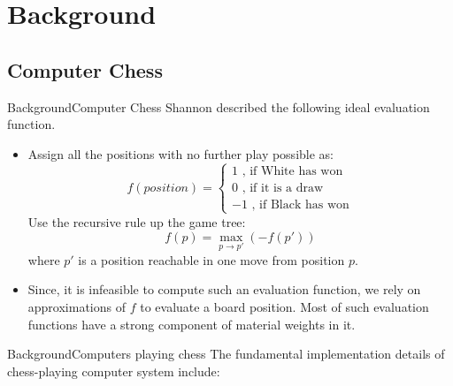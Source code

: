 \documentclass[9pt, unknownkeysallowed]{beamer}
\begin{document}
\section{Background}
\subsection{Computer Chess}
\begin{frame}{Background}{Computer Chess}
Shannon described the following ideal evaluation function.
\begin{itemize}[<+->]
 \item Assign all the positions with no further play possible as:
\[f(position) = \begin{cases}
1 \text{ , if White has won}\\
0 \text{ , if it is a draw}\\
-1 \text{ , if Black has won}
\end{cases}\]
Use the recursive rule up the game tree:
\[f(p) = \max\limits_{p\rightarrow p'} (-f(p'))\]
where $p'$ is a position reachable in one move from position $p$.
\item Since, it is infeasible to compute such an evaluation function, we rely on approximations of $f$ to evaluate a board position. Most of such evaluation functions have a strong component of material weights in it.
\end{itemize}
\end{frame}

\begin{frame}{Background}{Computers playing chess}
\label{subsection:conventional-chess}
The fundamental implementation details of chess-playing computer system include:
\end{frame}
\end{document}
